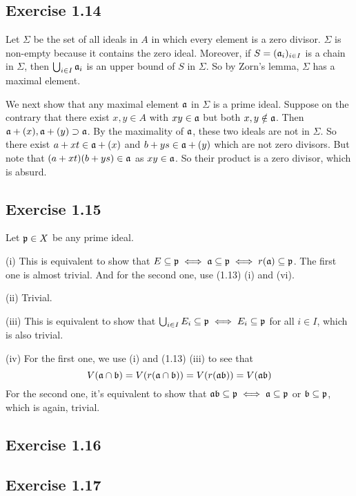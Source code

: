 \documentclass[../A&M.tex]{subfiles}
\begin{document}
\subsection*{Exercise 1.14}

Let $\Sigma$ be the set of all ideals in $A$ in which every element is a zero divisor. $\Sigma$ is non-empty because it contains the zero ideal. Moreover, if $S=(\mathfrak{a}_i)_{i\in I}$ is a chain in $\Sigma$, then $\bigcup_{i\in I} \mathfrak{a}_i$ is an upper bound of $S$ in $\Sigma$. So by Zorn's lemma, $\Sigma$ has a maximal element.

We next show that any maximal element $\mathfrak{a}$ in $\Sigma$ is a prime ideal. Suppose on the contrary that there exist $x,y\in A$ with $xy\in\mathfrak{a}$ but both $x,y\notin\mathfrak{a}$. Then $\mathfrak{a}+(x),\mathfrak{a}+(y) \supset \mathfrak{a}$. By the maximality of $\mathfrak{a}$, these two ideals are not in $\Sigma$. So there exist $a+xt\in\mathfrak{a}+(x)$ and $b+ys\in\mathfrak{a}+(y)$ which are not zero divisors. But note that $(a+xt)(b+ys) \in \mathfrak{a}$ as $xy\in\mathfrak{a}$. So their product is a zero divisor, which is absurd.

\subsection*{Exercise 1.15}

Let $\mathfrak{p}\in X$ be any prime ideal.

(i) This is equivalent to show that $E \subseteq \mathfrak{p} \iff \mathfrak{a} \subseteq \mathfrak{p} \iff r(\mathfrak{a}) \subseteq \mathfrak{p}$. The first one is almost trivial. And for the second one, use (1.13) (i) and (vi).

(ii) Trivial.

(iii) This is equivalent to show that $\bigcup_{i\in I} E_i \subseteq \mathfrak{p} \iff E_i \subseteq \mathfrak{p}$ for all $i\in I$, which is also trivial.

(iv) For the first one, we use (i) and (1.13) (iii) to see that
$$
V(\mathfrak{a} \cap \mathfrak{b}) = V(r(\mathfrak{a} \cap \mathfrak{b})) =  V(r(\mathfrak{a}\mathfrak{b})) = V(\mathfrak{a}\mathfrak{b}) 
$$
For the second one, it's equivalent to show that $\mathfrak{a}\mathfrak{b} \subseteq \mathfrak{p} \iff \mathfrak{a} \subseteq \mathfrak{p}$ or $\mathfrak{b} \subseteq \mathfrak{p}$, which is again, trivial.

\subsection*{Exercise 1.16}

\subsection*{Exercise 1.17}
\end{document}
